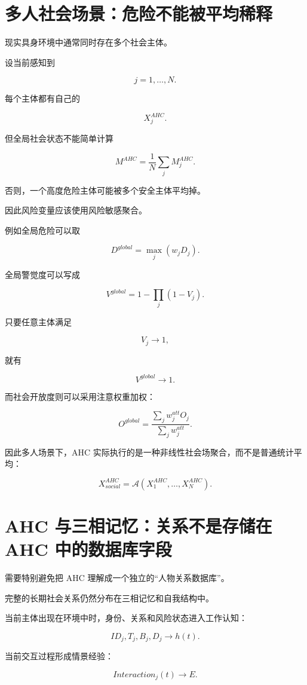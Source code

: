 \section{多人社会场景：危险不能被平均稀释}

现实具身环境中通常同时存在多个社会主体。

设当前感知到

\[
j=1,\ldots,N.
\]

每个主体都有自己的

\[
X_j^{AHC}.
\]

但全局社会状态不能简单计算

\[
M^{AHC}
=
\frac{1}{N}
\sum_j
M_j^{AHC}.
\]

否则，一个高度危险主体可能被多个安全主体平均掉。

因此风险变量应该使用风险敏感聚合。

例如全局危险可以取

\[
D^{global}
=
\max_j
\left(
w_jD_j
\right).
\]

全局警觉度可以写成

\[
\boxed{
V^{global}
=
1-
\prod_j
(1-V_j).
}
\]

只要任意主体满足

\[
V_j\rightarrow1,
\]

就有

\[
V^{global}\rightarrow1.
\]

而社会开放度则可以采用注意权重加权：

\[
O^{global}
=
\frac{
\sum_j
w_j^{att}O_j
}{
\sum_jw_j^{att}
}.
\]

因此多人场景下，AHC 实际执行的是一种非线性社会场聚合，而不是普通统计平均：

\[
\boxed{
X_{social}^{AHC}
=
\mathcal A
(
X_1^{AHC},
\ldots,
X_N^{AHC}
).
}
\]


\section{AHC 与三相记忆：关系不是存储在 AHC 中的数据库字段}

需要特别避免把 AHC 理解成一个独立的“人物关系数据库”。

完整的长期社会关系仍然分布在三相记忆和自我结构中。

当前主体出现在环境中时，身份、关系和风险状态进入工作认知：

\[
ID_j,
T_j,
B_j,
D_j
\rightarrow
h(t).
\]

当前交互过程形成情景经验：

\[
Interaction_j(t)
\rightarrow
E.
\]

